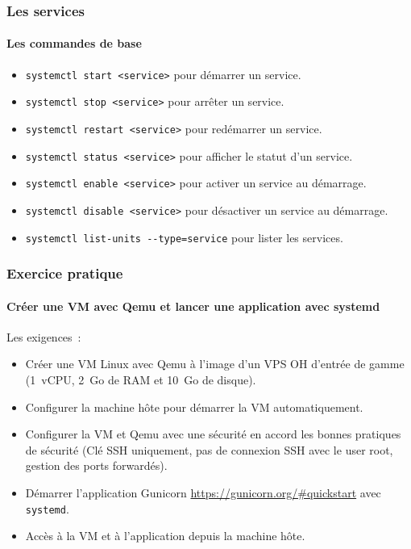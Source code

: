 \documentclass{beamer}
\begin{document}
    \begin{frame}
        \transdissolve
        \frametitle{Les services}
        \framesubtitle{Les commandes de base}
        \begin{itemize}
            \item \lstinline{systemctl start <service>} pour démarrer un service.
            \item \lstinline{systemctl stop <service>} pour arrêter un service.
            \item \lstinline{systemctl restart <service>} pour redémarrer un service.
            \item \lstinline{systemctl status <service>} pour afficher le statut d'un service.
            \item \lstinline{systemctl enable <service>} pour activer un service au démarrage.
            \item \lstinline{systemctl disable <service>} pour désactiver un service au démarrage.
            \item \lstinline{systemctl list-units --type=service} pour lister les services.
        \end{itemize}
    \end{frame}

    \begin{frame}
        \transdissolve
        \frametitle{Exercice pratique}
        \framesubtitle{Créer une VM avec Qemu et lancer une application avec systemd}
        Les exigences~:
        \begin{itemize}
            \item Créer une VM Linux avec Qemu à l'image d'un VPS OH d'entrée de gamme (1~vCPU, 2~Go de RAM et 10~Go de disque).
            \item Configurer la machine hôte pour démarrer la VM automatiquement.
            \item Configurer la VM et Qemu avec une sécurité en accord les bonnes pratiques de sécurité (Clé SSH uniquement, pas de connexion SSH avec le user root, gestion des ports forwardés).
            \item Démarrer l'application Gunicorn  \url{https://gunicorn.org/\#quickstart} avec \lstinline{systemd}.
            \item Accès à la VM et à l'application depuis la machine hôte.
        \end{itemize}
    \end{frame}
\end{document}
